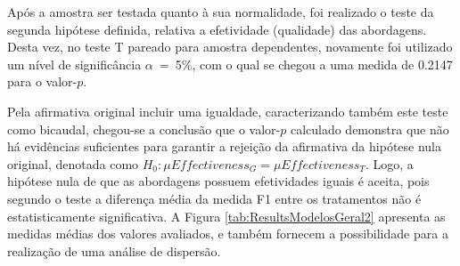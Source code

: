 Após a amostra ser testada quanto à sua normalidade, foi realizado o teste da segunda hipótese definida, relativa a efetividade (qualidade) das abordagens. 
Desta vez, no teste T pareado para amostra dependentes, novamente foi utilizado um nível de significância $\alpha$~=~5\%, com o qual se chegou a uma medida de 0.2147 para o valor-$p$. 

Pela afirmativa original incluir uma igualdade, caracterizando também este teste como bicaudal, chegou-se a conclusão que o valor-$p$ calculado demonstra que não há evidências suficientes para garantir a rejeição da afirmativa da hipótese nula original, denotada como $H_0 : \mu Effectiveness_G = \mu Effectiveness_T$.
Logo, a hipótese nula de que as abordagens possuem efetividades iguais é aceita, pois segundo o teste a diferença média da medida F1 entre os tratamentos não é estatisticamente significativa.
A Figura \ref{tab:ResultsModelosGeral2} apresenta as medidas médias dos valores avaliados, e também fornecem a possibilidade para a realização de uma análise de dispersão.

